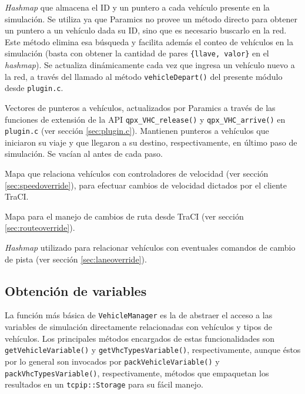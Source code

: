 \begin{description}[]
    \item[\texttt{vehicles\_in\_sim}] \emph{Hashmap} que almacena el ID y un puntero a cada vehículo presente en la simulación. Se utiliza ya que Paramics no provee un método directo para obtener un puntero a un vehículo dada su ID, sino que es necesario buscarlo en la red. Este método elimina esa búsqueda y facilita además el conteo de vehículos en la simulación (basta con obtener la cantidad de pares \texttt{\{llave, valor\}} en el \emph{hashmap}). Se actualiza dinámicamente cada vez que ingresa un vehículo nuevo a la red, a través del llamado al método \texttt{vehicleDepart()} del presente módulo desde \texttt{plugin.c}.
    
    \item[\texttt{departed\_vehicles} y \texttt{arrived\_vehicles}] Vectores de punteros a vehículos, actualizados por Paramics a través de las funciones de extensión de la API \texttt{qpx\_VHC\_release()} y \texttt{qpx\_VHC\_arrive()} en \texttt{plugin.c} (ver sección \ref{sec:plugin.c}). Mantienen punteros a vehículos que iniciaron su viaje y que llegaron a su destino, respectivamente, en último paso de simulación. Se vacían al antes de cada paso.
    
    \item[\texttt{speed\_controllers}] Mapa que relaciona vehículos con controladores de velocidad (ver sección \ref{sec:speedoverride}), para efectuar cambios de velocidad dictados por el cliente TraCI.
    
    \item [\texttt{vhc\_routes}] Mapa para el manejo de cambios de ruta desde TraCI (ver sección \ref{sec:routeoverride}).
    
    \item[\texttt{lane\_set\_triggers}] \emph{Hashmap} utilizado para relacionar vehículos con eventuales comandos de cambio de pista (ver sección \ref{sec:laneoverride}).
\end{description}

\subsection{Obtención de variables}

La función más básica de \texttt{VehicleManager} es la de abstraer el acceso a las variables de simulación directamente relacionadas con vehículos y tipos de vehículos. Los principales métodos encargados de estas funcionalidades son \texttt{getVehicleVariable()} y \texttt{getVhcTypesVariable()}, respectivamente, aunque éstos por lo general son invocados por \texttt{packVehicleVariable()} y \texttt{packVhcTypesVariable()}, respectivamente, métodos que empaquetan los resultados en un \texttt{tcpip::Storage} para su fácil manejo. 

